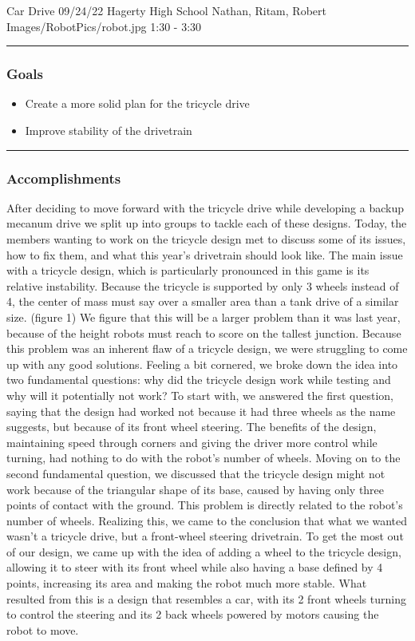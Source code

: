 \insertmeeting 
	{Car Drive} 
	{09/24/22}
	{Hagerty High School}
	{Nathan, Ritam, Robert}
	{Images/RobotPics/robot.jpg}
	{1:30 - 3:30}
	
\noindent\hfil\rule{\textwidth}{.4pt}\hfil
\subsubsection*{Goals}
\begin{itemize}
    \item Create a more solid plan for the tricycle drive
	\item Improve stability of the drivetrain


\end{itemize} 

\noindent\hfil\rule{\textwidth}{.4pt}\hfil

\subsubsection*{Accomplishments}
After deciding to move forward with the tricycle drive while developing a backup mecanum drive we split up into groups to tackle each of these designs. Today, the members wanting to work on the tricycle design met to discuss some of its issues, how to fix them, and what this year's drivetrain should look like. The main issue with a tricycle design, which is particularly pronounced in this game is its relative instability. Because the tricycle is supported by only 3 wheels instead of 4, the center of mass must say over a smaller area than a tank drive of a similar size. (figure 1) We figure that this will be a larger problem than it was last year, because of the height robots must reach to score on the tallest junction. Because this problem was an inherent flaw of a tricycle design, we were struggling to come up with any good solutions. Feeling a bit cornered, we broke down the idea into two fundamental questions: why did the tricycle design work while testing and why will it potentially not work? To start with, we answered the first question, saying that the design had worked not because it had three wheels as the name suggests, but because of its front wheel steering. The benefits of the design, maintaining speed through corners and giving the driver more control while turning, had nothing to do with the robot’s number of wheels. Moving on to the second fundamental question, we discussed that the tricycle design might not work because of the triangular shape of its base, caused by having only three points of contact with the ground. This problem is directly related to the robot’s number of wheels. Realizing this, we came to the conclusion that what we wanted wasn’t a tricycle drive, but a front-wheel steering drivetrain. To get the most out of our design, we came up with the idea of adding a wheel to the tricycle design, allowing it to steer with its front wheel while also having a base defined by 4  points, increasing its area and making the robot much more stable. What resulted from this is a design that resembles a car, with its 2 front wheels turning to control the steering and its 2 back wheels powered by motors causing the robot to move.


